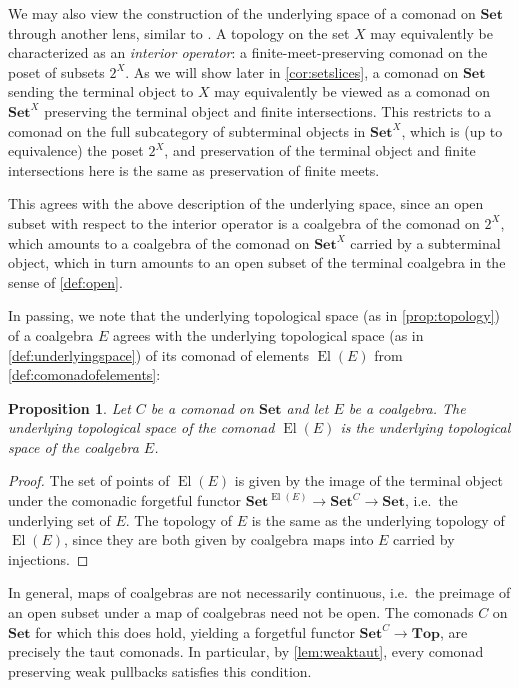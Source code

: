 \documentclass[11pt, oneside, article]{memoir}
\theoremstyle{plain}
\newtheorem{proposition}[theorem]{Proposition}
\theoremstyle{definition}
\theoremstyle{remark}
\newenvironment{remark}
{\renewcommand\qedsymbol{$\lrcorner$}%
  \pushQED{\qed}\myremark}
{\popQED\endmyremark}
\DeclareMathOperator{\El}{El}
\newcommand{\namedcat}[1]{\mathbf{#1}}
\newcommand{\Set}{\namedcat{Set}}
\renewcommand{\Top}{\namedcat{Top}}
\newcommand{\CoalgOn}[2]{{#2}^{#1}}
\newcommand{\CoalgSet}[1]{\CoalgOn{#1}{\Set}}
\newcommand{\cmnd}[1]{{#1}}
\newcommand{\eE}{E}
\newcommand{\xX}{X}
\newcommand{\cC}{\cmnd{C}}
\newcommand{\CSet}{\CoalgSet{\cC}}
\begin{document}
\begin{remark}
  We may also view the construction of the underlying space of a
  comonad on $\Set$ through another lens, similar to \cite[Example
  4.8]{garner:ionads}. A topology on the set $\xX$ may equivalently be
  characterized as an \emph{interior operator}: a
  finite-meet-preserving comonad on the poset of subsets $2^\xX$. As
  we will show later in \cref{cor:setslices}, a comonad on $\Set$
  sending the terminal object to $\xX$ may equivalently be viewed as a
  comonad on $\Set^\xX$ preserving the terminal object and finite
  intersections. This restricts to a comonad on the full subcategory
  of subterminal objects in $\Set^\xX$, which is (up to equivalence)
  the poset $2^\xX$, and preservation of the terminal object and
  finite intersections here is the same as preservation of finite
  meets.

  This agrees with the above description of the underlying space,
  since an open subset with respect to the interior operator is a
  coalgebra of the comonad on $2^\xX$, which amounts to a coalgebra of
  the comonad on $\Set^\xX$ carried by a subterminal object, which in
  turn amounts to an open subset of the terminal coalgebra in the
  sense of \cref{def:open}.
\end{remark}

In passing, we note that the underlying topological space (as in
\cref{prop:topology}) of a coalgebra $\eE$ agrees with the underlying
topological space (as in \cref{def:underlyingspace}) of its comonad of
elements $\El(\eE)$ from \cref{def:comonadofelements}:

\begin{proposition}
  Let $\cC$ be a comonad on $\Set$ and let $\eE$ be a
  coalgebra. The underlying topological space of the comonad
  $\El(\eE)$ is the underlying topological space of the coalgebra
  $\eE$.
\end{proposition}
\begin{proof}
  The set of points of $\El(\eE)$ is given by the image of the
  terminal object under the comonadic forgetful functor
  $\CoalgSet{\El(\eE)} \to \CSet \to \Set$, i.e.\ the underlying
  set of $\eE$. The topology of $\eE$ is the same as the
  underlying topology of $\El(\eE)$, since they are both given by
  coalgebra maps into $\eE$ carried by injections.
\end{proof}

In general, maps of coalgebras are not necessarily continuous, i.e.\
the preimage of an open subset under a map of coalgebras need not be
open. The comonads $\cC$ on $\Set$ for which this does hold, yielding
a forgetful functor $\CSet \to \Top$, are precisely the taut
comonads. In particular, by \cref{lem:weaktaut}, every comonad
preserving weak pullbacks satisfies this condition.
\end{document}
